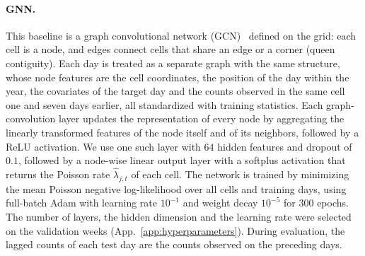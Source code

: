 \paragraph{GNN.}
This baseline is a graph convolutional network (GCN)~\citep{kipf2017semi} defined on the grid: each cell is a node, and edges connect cells that share an edge or a corner (queen contiguity). Each day is treated as a separate graph with the same structure, whose node features are the cell coordinates, the position of the day within the year, the covariates of the target day and the counts observed in the same cell one and seven days earlier, all standardized with training statistics. Each graph-convolution layer updates the representation of every node by aggregating the linearly transformed features of the node itself and of its neighbors, followed by a ReLU activation. We use one such layer with 64 hidden features and dropout of $0.1$, followed by a node-wise linear output layer with a softplus activation that returns the Poisson rate $\widehat{\lambda}_{j,t}$ of each cell. The network is trained by minimizing the mean Poisson negative log-likelihood over all cells and training days, using full-batch Adam with learning rate $10^{-1}$ and weight decay $10^{-5}$ for 300 epochs. The number of layers, the hidden dimension and the learning rate were selected on the validation weeks (App.~\ref{app:hyperparameters}). During evaluation, the lagged counts of each test day are the counts observed on the preceding days.
